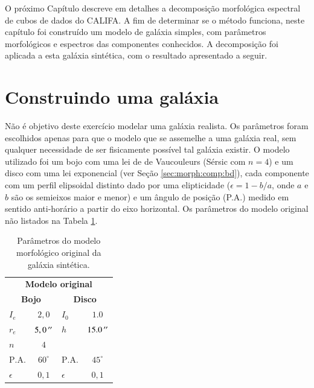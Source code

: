 O próximo Capítulo descreve em detalhes a decomposição morfológica espectral de
cubos de dados do CALIFA. A fim de determinar se o método funciona, neste
capítulo foi construído um modelo de galáxia simples, com parâmetros
morfológicos e espectros das componentes conhecidos. A decomposição foi aplicada
a esta galáxia sintética, com o resultado apresentado a seguir.

\section{Construindo uma galáxia}

Não é objetivo deste exercício modelar uma galáxia realista. Os parâmetros foram
escolhidos apenas para que o modelo que se assemelhe a uma galáxia real, sem
qualquer necessidade de ser fisicamente possível tal galáxia existir. O modelo
utilizado foi um bojo com uma lei de de Vaucouleurs (Sérsic com $n=4$) e um
disco com uma lei exponencial (ver Seção \ref{sec:morph:comp:bd}), cada
componente com um perfil elipsoidal distinto dado por uma elipticidade
($\epsilon = 1 - b/a$, onde $a$ e $b$ são os semieixos maior e menor) e um
ângulo de posição (P.A.) medido em sentido anti-horário a partir do eixo
horizontal. Os parâmetros do modelo original não listados na Tabela
\ref{tab:testeModeloOriginal}.

\begin{table}
\begin{tabular}{ l  c | l  c }
  \hline
  \multicolumn{4}{c}{\textbf{Modelo original}} \\
  \multicolumn{2}{c}{\textbf{Bojo}} & \multicolumn{2}{c}{\textbf{Disco}} \\
  \hline
  $I_e$ & $2,0$ & $I_0$ & $1.0$ \\
  $r_e$ & $5,0\,^{\prime\prime}$ & $h$ & $15.0\,^{\prime\prime}$ \\
  $n$ & $4$ & & \\
  $\mathrm{P.A.}$ & $60^\circ$ & $\mathrm{P.A.}$ & $45^\circ$ \\
  $\epsilon$ & $0,1$ & $\epsilon$ & $0,1$ \\
  \hline
\end{tabular}
\caption[Modelo morfológico original da galáxia sintética]
{Parâmetros do modelo morfológico original da galáxia sintética.}
\label{tab:testeModeloOriginal}
\end{table}

